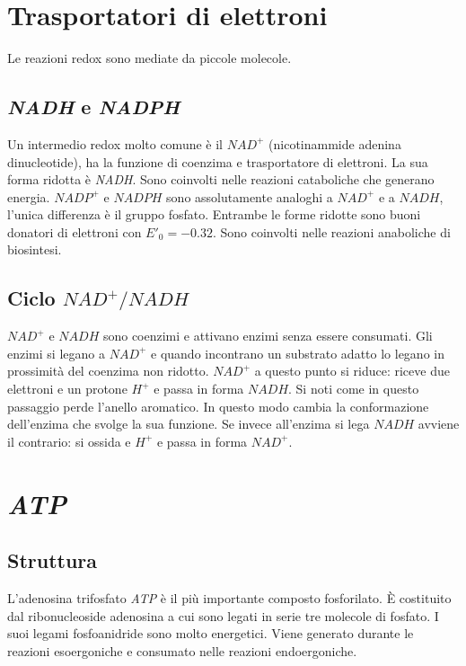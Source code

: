\section{Trasportatori di elettroni}
Le reazioni redox sono mediate da piccole molecole. 

	\subsection{\emph{NADH} e \emph{NADPH}}
	Un intermedio redox molto comune \`e il \emph{$NAD^+$} (nicotinammide adenina dinucleotide), ha la funzione di coenzima e trasportatore di elettroni.
	La sua forma ridotta \`e \emph{NADH}. 
	Sono coinvolti nelle reazioni cataboliche che generano energia.
	\emph{$NADP^+$} e \emph{$NADPH$} sono assolutamente analoghi a \emph{$NAD^+$} e a \emph{$NADH$}, l'unica differenza \`e il gruppo fosfato.
	Entrambe le forme ridotte sono buoni donatori di elettroni con $E'_0=-0.32$.
	Sono coinvolti nelle reazioni anaboliche di biosintesi.
	
	\subsection{Ciclo \emph{$NAD^+/NADH$}}
	\emph{$NAD^+$} e \emph{$NADH$} sono coenzimi e attivano enzimi senza essere consumati.
	Gli enzimi si legano a \emph{$NAD^+$} e quando incontrano un substrato adatto lo legano in prossimit\`a del coenzima non ridotto.
	\emph{$NAD^+$} a questo punto si riduce: riceve due elettroni e un protone \emph{$H^+$} e passa in forma \emph{$NADH$}.
	Si noti come in questo passaggio perde l'anello aromatico.
	In questo modo cambia la conformazione dell'enzima che svolge la sua funzione.
	Se invece all'enzima si lega \emph{$NADH$} avviene il contrario: si ossida e \emph{$H^+$} e passa in forma \emph{$NAD^+$}.

\section{\emph{ATP}}

	\subsection{Struttura}
	L'adenosina trifosfato \emph{ATP} \`e il pi\`u importante composto fosforilato. 
	\`E costituito dal ribonucleoside adenosina a cui sono legati in serie tre molecole di fosfato. 
	I suoi legami fosfoanidride sono molto energetici.
	Viene generato durante le reazioni esoergoniche e consumato nelle reazioni endoergoniche. 

